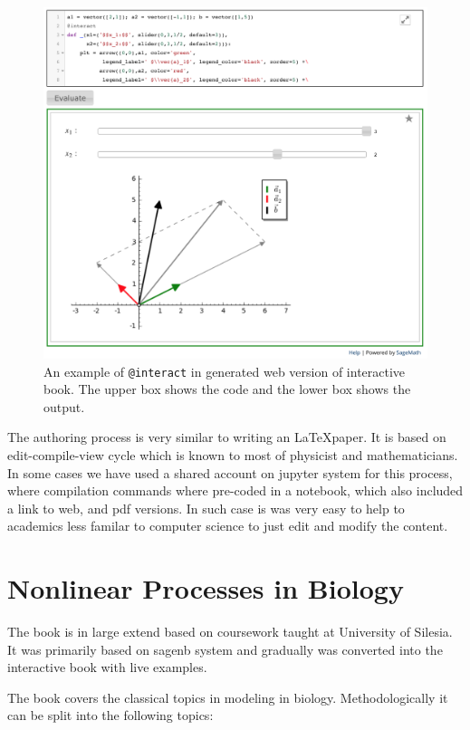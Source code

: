 \documentclass{deliverablereport}
\begin{document}
\begin{figure}
\centerline{\includegraphics[width=.7\textwidth]{interact_in_sphinx.png}}
\caption{\label{fig:interact_sphinx} An example of \texttt{@interact} in
  \Sphinx generated web version of interactive book. The upper box
  shows the code and the lower box shows the output.}
\end{figure}


The authoring process is very similar to writing an \LaTeX paper. It
is based on edit-compile-view cycle which is known to most of
physicist and mathematicians. In some cases we have used a shared
account on jupyter system for this process, where compilation commands
where pre-coded in a \Jupyter notebook, which also included a link to
web, and pdf versions. In such case is was very easy to help to
academics less familar to computer science to just edit and modify the
content.


\section{ Nonlinear Processes in Biology }


The book is in large extend based on coursework taught at University
of Silesia. It was primarily based on sagenb system and gradually was
converted into the interactive book with live examples.


The book covers the classical topics in modeling in
biology. Methodologically it can be split into the following topics:
\end{document}
